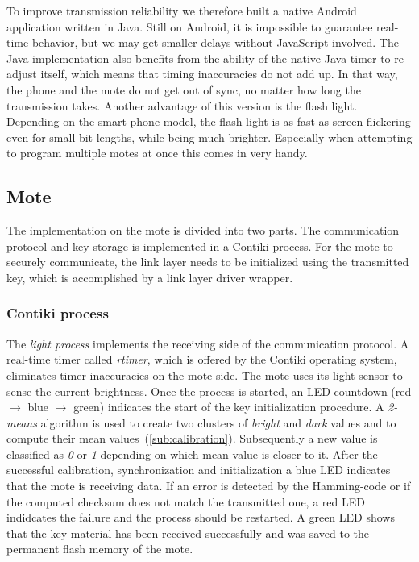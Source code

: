 \documentclass{sig-alternate} %
\begin{document}
To improve transmission reliability we therefore built a native Android application written in Java.
Still on Android, it is impossible to guarantee real-time behavior, but we may get smaller delays without JavaScript involved.
The Java implementation also benefits from the ability of the native Java timer to re-adjust itself, which means that timing inaccuracies do not add up.
In that way, the phone and the mote do not get out of sync, no matter how long the transmission takes.
Another advantage of this version is the flash light.
Depending on the smart phone model, the flash light is as fast as screen flickering even for small bit lengths, while being much brighter.
Especially when attempting to program multiple motes at once this comes in very handy.


\subsection{Mote}
\label{sub:mote}

The implementation on the mote is divided into two parts.
The communication protocol and key storage is implemented in a Contiki process.
For the mote to securely communicate, the link layer needs to be initialized using the transmitted key, which is accomplished by a link layer driver wrapper.

\subsubsection{Contiki process}
\label{ssub:contiki_process}

The \textit{light process} implements the receiving side of the communication protocol.
A real-time timer called \textit{rtimer}, which is offered by the Contiki operating system, eliminates timer inaccuracies on the mote side.
The mote uses its light sensor to sense the current brightness.
Once the process is started, an LED-countdown (red $\rightarrow$ blue $\rightarrow$ green) indicates the start of the key initialization procedure.
A \mbox{\textit{2-means}} algorithm is used to create two clusters of \textit{bright} and \textit{dark} values and to compute their mean values~(\ref{sub:calibration}).
Subsequently a new value is classified as \textit{0} or \textit{1} depending on which mean value is closer to it.
After the successful calibration, synchronization and initialization a blue LED indicates that the mote is receiving data.
If an error is detected by the Hamming-code or if the computed checksum does not match the transmitted one, a red LED indidcates the failure and the process should be restarted.
A green LED shows that the key material has been received successfully and was saved to the permanent flash memory of the mote.
\end{document}
